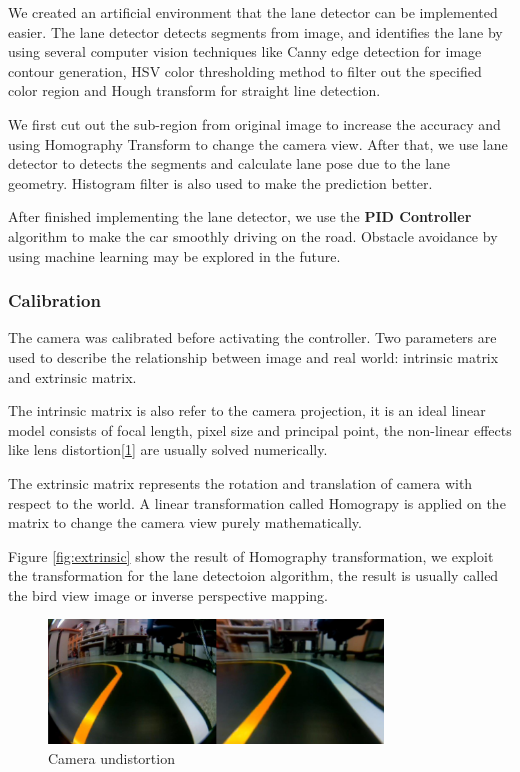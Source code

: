 \documentclass[conference]{IEEEtran}
\begin{document}
We created an artificial environment that the lane detector can be implemented easier. The lane detector detects segments from image, and identifies the lane by using several computer vision techniques like Canny edge detection for image contour generation, HSV color thresholding method to filter out the specified color region and Hough transform for straight line detection.

We first cut out the sub-region from original image to increase the accuracy and using Homography Transform to change the camera view. After that, we use lane detector to detects the segments and calculate lane pose due to the lane geometry. Histogram filter is also used to make the prediction better. 

After finished implementing the lane detector, we use the \textbf{PID Controller} algorithm to make the car smoothly driving on the road. Obstacle avoidance by using machine learning may be explored in the future.

\subsubsection{Calibration}

The camera was calibrated before activating the controller. Two parameters are used to describe the relationship between image and real world: intrinsic matrix and extrinsic matrix.

The intrinsic matrix is also refer to the camera projection, it is an ideal linear model consists of focal length, pixel size and principal point, the non-linear effects like lens distortion[\ref{fig:intrinsic}] are usually solved numerically.

The extrinsic matrix represents the rotation and translation of camera with respect to the world. A linear transformation called Homograpy is applied on  the matrix to change the camera view purely mathematically.

Figure \ref{fig:extrinsic} show the result of Homography transformation, we exploit the transformation for the lane detectoion algorithm, the result is usually called the bird view image or inverse perspective mapping.

\begin{figure}
	\centering
	\includegraphics[width=3.5in]{img/intrinsic.png}
	\caption{Camera undistortion}
	\label{fig:intrinsic}
\end{figure}
\end{document}
